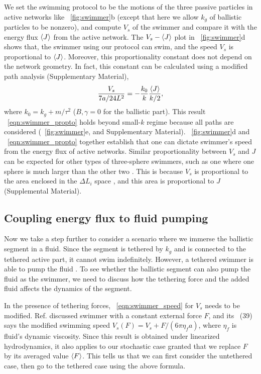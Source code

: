 \documentclass[
 preprint,
 preprintnumbers,
 amsmath,amssymb,
 aps,
 pre,
 longbibliography,
 superscriptaddress,
 10pt, twocolumn
]{revtex4-1}
\begin{document}
We set the swimming protocol to be the motions of the three passive particles in active networks like \figurename~\ref{fig:swimmer}b (except that here we allow $k_g$ of ballistic particles to be nonzero),
and compute $V_s$ of the swimmer and compare it with the energy flux $\expval{J}$ from the active network.
The $V_s-\expval{J}$ plot in \figurename~\ref{fig:swimmer}d shows that, the swimmer using our protocol can swim, and the speed $V_s$ is proportional to $\expval{J}$. Moreover, this proportionality constant does not depend on the network geometry.
In fact, this constant can be calculated using a modified path analysis (Supplementary Material),
\begin{equation} \label{eqn:swimmer_propto}
    \frac{V_s}{7a/24L^2} = -\frac{k_0}{k} \frac{\expval{J}}{k/2},
\end{equation}
where $k_0 = k_g + m/\tau^2$ ($B,\gamma=0$ for the ballistic part).
This result \eqnname~\eqref{eqn:swimmer_propto} holds beyond small-$k$ regime because all paths are considered (\figurename~\ref{fig:swimmer}e, and Supplementary Material).
\figurename~\ref{fig:swimmer}d and \eqnname~\eqref{eqn:swimmer_propto} together establish that one can dictate swimmer's speed from the energy flux of active networks.
Similar proportionality between $V_s$ and $J$ can be expected for other types of three-sphere swimmers, such as one where one sphere is much larger than the other two \cite{Golestanian2008ThreesphereLowReynoldsnumber}. This is because $V_s$ is proportional to the area enclosed in the $\Delta L_i$ space \cite{Golestanian2009StochasticLow}, and this area is proportional to $J$ (Supplemental Material).

\subsection{Coupling energy flux to fluid pumping}
Now we take a step further to consider a scenario where we immerse the ballistic segment in a fluid. Since the segment is tethered by $k_g$ and is connected to the tethered active part, it cannot swim indefinitely. However, a tethered swimmer is able to pump the fluid \cite{Leoni2009BasicSwimmer}. To see whether the ballistic segment can also pump the fluid as the swimmer, we need to discuss how the tethering force and the added fluid affects the dynamics of the segment.

In the presence of tethering forces, \eqnname~\eqref{eqn:swimmer_speed} for $V_s$ needs to be modified.
Ref. \cite{Golestanian2008AnalyticResults} discussed swimmer with a constant external force $F$, and its \eqnname~(39) says the modified swimming speed $V_s(F) = V_s + F/(6\pi\eta_f a)$, where $\eta_f$ is fluid's dynamic viscosity.
Since this result is obtained under linearized hydrodynamics, it also applies to our stochastic case granted that we replace $F$ by its averaged value $\expval{F}$.
This tells us that we can first consider the untethered case, then go to the tethered case using the above formula.
\end{document}
